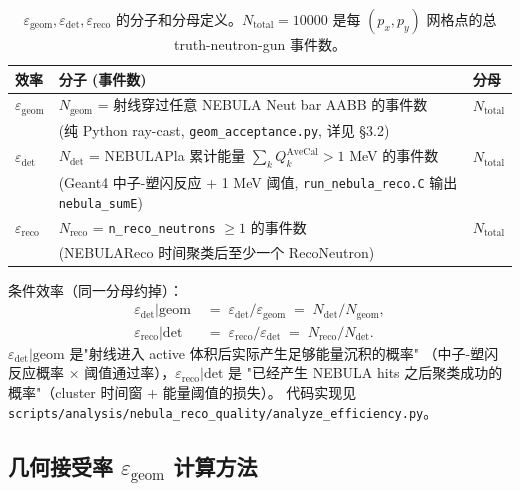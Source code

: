 \documentclass[a4paper,11pt]{ctexart}
\begin{document}
\begin{table}[h]
\centering
\caption{$\varepsilon_\mathrm{geom}, \varepsilon_\mathrm{det}, \varepsilon_\mathrm{reco}$
的分子和分母定义。$N_\mathrm{total} = 10000$ 是每 $(p_x, p_y)$ 网格点的总 truth-neutron-gun 事件数。}
\label{tab:eps_defs}
\begin{tabular}{lll}
\toprule
效率 & 分子 (事件数) & 分母 \\
\midrule
$\varepsilon_\mathrm{geom}$ & $N_\mathrm{geom}$ = 射线穿过任意 NEBULA Neut bar AABB 的事件数 &
$N_\mathrm{total}$ \\
& {\small (纯 Python ray-cast, \texttt{geom\_acceptance.py}, 详见 \S3.2)} & \\
\midrule
$\varepsilon_\mathrm{det}$ & $N_\mathrm{det}$ = NEBULAPla 累计能量 $\sum_k Q^\mathrm{AveCal}_k > 1$ MeV 的事件数 &
$N_\mathrm{total}$ \\
& {\small (Geant4 中子-塑闪反应 + 1 MeV 阈值, \texttt{run\_nebula\_reco.C} 输出 \texttt{nebula\_sumE})} & \\
\midrule
$\varepsilon_\mathrm{reco}$ & $N_\mathrm{reco}$ = \texttt{n\_reco\_neutrons} $\geq 1$ 的事件数 &
$N_\mathrm{total}$ \\
& {\small (NEBULAReco 时间聚类后至少一个 RecoNeutron)} & \\
\bottomrule
\end{tabular}
\end{table}

条件效率（同一分母约掉）：
\begin{align*}
\varepsilon_\mathrm{det}|\mathrm{geom} &\;=\; \varepsilon_\mathrm{det} \big/ \varepsilon_\mathrm{geom}
\;=\; N_\mathrm{det} \big/ N_\mathrm{geom}, \\
\varepsilon_\mathrm{reco}|\mathrm{det} &\;=\; \varepsilon_\mathrm{reco} \big/ \varepsilon_\mathrm{det}
\;=\; N_\mathrm{reco} \big/ N_\mathrm{det}.
\end{align*}
$\varepsilon_\mathrm{det}|\mathrm{geom}$ 是"射线进入 active 体积后实际产生足够能量沉积的概率"
（中子-塑闪反应概率 $\times$ 阈值通过率），$\varepsilon_\mathrm{reco}|\mathrm{det}$ 是
"已经产生 NEBULA hits 之后聚类成功的概率"（cluster 时间窗 + 能量阈值的损失）。
代码实现见 \texttt{scripts/analysis/nebula\_reco\_quality/analyze\_efficiency.py}。

\subsection{几何接受率 $\varepsilon_\mathrm{geom}$ 计算方法}
\label{sec:geom_acceptance}
\end{document}
